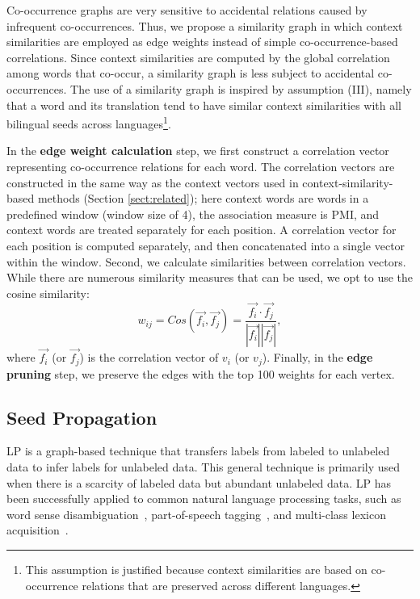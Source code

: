 \documentclass[english]{jnlp_1.4}
\begin{document}
Co-occurrence graphs are very sensitive to accidental relations caused by infrequent co-occurrences. 
Thus, we propose a similarity graph in which context similarities are employed as edge weights instead of simple co-occurrence-based correlations. 
Since context similarities are computed by the global correlation among words that co-occur, a similarity graph is less subject to accidental co-occurrences. 
The use of a similarity graph is inspired by assumption (III), namely that a word and its translation tend to have similar context similarities with all bilingual seeds across languages\footnote{This assumption is justified because context similarities are based on co-occurrence relations that are preserved across different languages.}. 

In the {\bf edge weight calculation} step, we first construct a correlation vector representing co-occurrence relations for each word. 
The correlation vectors are constructed in the same way as the context vectors used in context-similarity-based methods (Section \ref{sect:related}); here context words are words in a predefined window (window size of 4), the association measure is PMI, and context words are treated separately for each position. 
A correlation vector for each position is computed separately, and then concatenated into a single vector within the window. 
Second, we calculate similarities between correlation vectors. 
While there are numerous similarity measures that can be used, we opt to use the cosine similarity: 
\begin{equation}
w_{ij}=\mathit{Cos}(\vec{f_{i}},\vec{f_{j}})=\frac{\vec{f_{i}}\cdot\vec{f_{j}}}{|\vec{f_{i}}||\vec{f_{j}}|}, 
\end{equation}
where $\vec{f_{i}}$ (or $\vec{f_{j}}$) is the correlation vector of $v_{i}$ (or $v_{j}$). 
Finally, in the {\bf edge pruning} step, we preserve the edges with the top 100 weights for each vertex. 


\subsection{Seed Propagation}
\label{sect:propagate}

LP is a graph-based technique that transfers labels from labeled to unlabeled data to infer labels for unlabeled data. 
This general technique is primarily used when there is a scarcity of labeled data but abundant unlabeled data. 
LP has been successfully applied to common natural language processing tasks, such as word sense disambiguation~\cite{niu05,andrei07}, part-of-speech tagging~\cite{das11}, and multi-class lexicon acquisition~\cite{andrei07}. 
\end{document}
